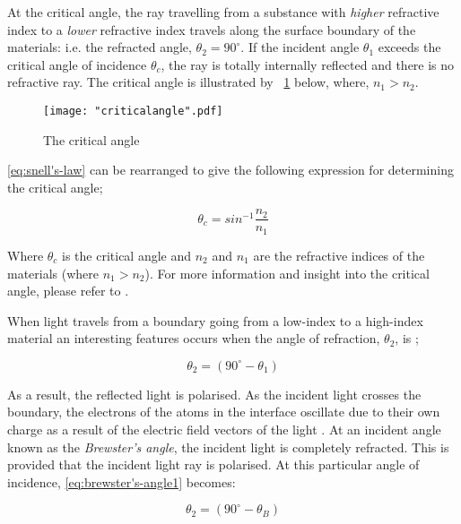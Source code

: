 \documentclass{article}
\newcommand{\figref}[2][\figurename~]{#1\ref{#2}}
\begin{document}
\vspace{2mm}
\noindent
At the critical angle, the ray travelling from a substance with \textit{higher} refractive index to a \textit{lower} refractive index travels along the surface boundary of the materials: i.e. the refracted angle, $\theta_2=90^{\circ}$. If the incident angle $\theta_1$ exceeds the critical angle of incidence $\theta_c$, the ray is totally internally reflected and there is no refractive ray. The critical angle is illustrated by \figref{fig:critical-angle} below, where, $n_1>n_2$.

\begin{figure}[h]
\centering
\texttt{[image: "criticalangle".pdf]}
\caption{The critical angle}
\label{fig:critical-angle}
\end{figure}

\noindent
\eqref{eq:snell's-law} can be rearranged to give the following expression for determining the critical angle;

\begin{equation}
\label{eq:critical-angle}
\theta_c = sin^{-1}\frac{n_2}{n_1}
\end{equation}

\noindent
Where $\theta_c$ is the critical angle and $n_2$ and $n_1$ are the refractive indices of the materials (where $n_1>n_2$). For more information and insight into the critical angle, please refer to \cite{Book01}.

\vspace{2mm}
\noindent
When light travels from a boundary going from a low-index to a high-index material an interesting features occurs when the angle of refraction, $\theta_2$, is \cite{Paper01};

\begin{equation}
\label{eq:brewster's-angle1}
\theta_2 = (90^{\circ} - \theta_1)
\end{equation}

\noindent
As a result, the reflected light is polarised. As the incident light crosses the boundary, the electrons of the atoms in the interface oscillate due to their own charge as a result of the electric field vectors of the light \cite{Paper01}. At an incident angle known as the \textit{Brewster's angle}, the incident light is completely refracted. This is provided that the incident light ray is polarised. At this particular angle of incidence, \eqref{eq:brewster's-angle1} becomes:

\begin{equation}
\label{eq:brewster's-angle2}
\theta_2 = (90^{\circ} - \theta_B)
\end{equation}
\end{document}
